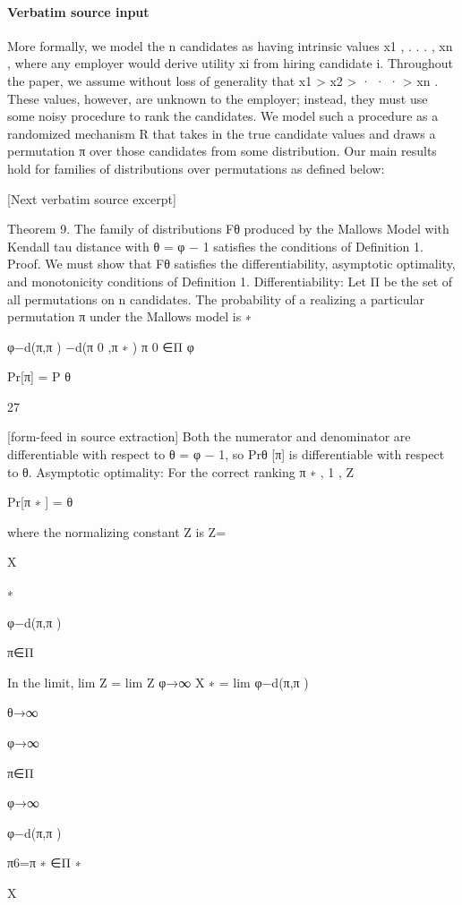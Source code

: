 \documentclass[10pt]{article}
\begin{document}
\paragraph{Verbatim source input}
\begin{ReviewVerbatim}
More formally, we model the n candidates as having intrinsic values x1 , . . . , xn , where any employer would
derive utility xi from hiring candidate i. Throughout the paper, we assume without loss of generality that
x1 > x2 > · · · > xn . These values, however, are unknown to the employer; instead, they must use some
noisy procedure to rank the candidates. We model such a procedure as a randomized mechanism R that
takes in the true candidate values and draws a permutation π over those candidates from some distribution.
Our main results hold for families of distributions over permutations as defined below:

[Next verbatim source excerpt]

Theorem 9. The family of distributions Fθ produced by the Mallows Model with Kendall tau distance with
θ = φ − 1 satisfies the conditions of Definition 1.
Proof. We must show that Fθ satisfies the differentiability, asymptotic optimality, and monotonicity conditions of Definition 1.
Differentiability: Let Π be the set of all permutations on n candidates. The probability of a realizing
a particular permutation π under the Mallows model is
∗

φ−d(π,π )
−d(π 0 ,π ∗ )
π 0 ∈Π φ

Pr[π] = P
θ

27


[form-feed in source extraction]
Both the numerator and denominator are differentiable with respect to θ = φ − 1, so Prθ [π] is differentiable
with respect to θ.
Asymptotic optimality: For the correct ranking π ∗ ,
1
,
Z

Pr[π ∗ ] =
θ

where the normalizing constant Z is
Z=

X

∗

φ−d(π,π )

π∈Π

In the limit,
lim Z = lim Z
φ→∞
X
∗
= lim
φ−d(π,π )

θ→∞

φ→∞

π∈Π

φ→∞

φ−d(π,π )

π6=π ∗ ∈Π
∗

X


\end{ReviewVerbatim}
\end{document}
